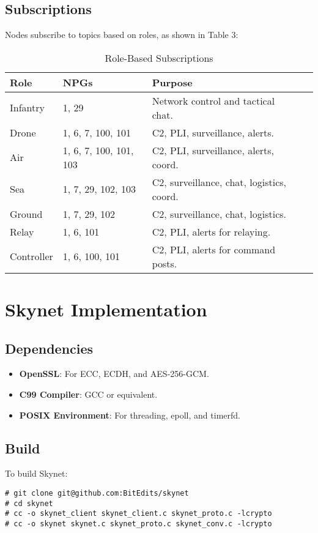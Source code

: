 \documentclass{article}
\begin{document}
\newpage
\subsection{Subscriptions}
Nodes subscribe to topics based on roles, as shown in Table 3:
\begin{table}[h]
\centering
\caption{Role-Based Subscriptions}
\begin{tabular}{lllp{5cm}}
\hline
\textbf{Role} & \textbf{NPGs} & \textbf{Purpose} \\
\hline
Infantry   & 1, 29                  & Network control and tactical chat. \\
Drone      & 1, 6, 7, 100, 101      & C2, PLI, surveillance, alerts. \\
Air        & 1, 6, 7, 100, 101, 103 & C2, PLI, surveillance, alerts, coord. \\
Sea        & 1, 7, 29, 102, 103     & C2, surveillance, chat, logistics, coord. \\
Ground     & 1, 7, 29, 102          & C2, surveillance, chat, logistics. \\
Relay      & 1, 6, 101              & C2, PLI, alerts for relaying. \\
Controller & 1, 6, 100, 101         & C2, PLI, alerts for command posts. \\
\hline
\end{tabular}
\end{table}

\section{Skynet Implementation}

\subsection{Dependencies}
\begin{itemize}
    \item \textbf{OpenSSL}: For ECC, ECDH, and AES-256-GCM.
    \item \textbf{C99 Compiler}: GCC or equivalent.
    \item \textbf{POSIX Environment}: For threading, epoll, and timerfd.
\end{itemize}

\subsection{Build}
To build Skynet:
\begin{lstlisting}
# git clone git@github.com:BitEdits/skynet
# cd skynet
# cc -o skynet_client skynet_client.c skynet_proto.c -lcrypto
# cc -o skynet skynet.c skynet_proto.c skynet_conv.c -lcrypto
\end{lstlisting}
\end{document}

